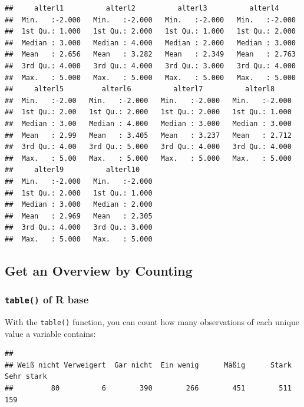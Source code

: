 \documentclass[
  doc]{apa6}
\newenvironment{Shaded}{\begin{snugshade}}{\end{snugshade}}
\newcommand{\FunctionTok}[1]{\textcolor[rgb]{0.13,0.29,0.53}{\textbf{#1}}}
\newcommand{\NormalTok}[1]{#1}
\newcommand{\SpecialCharTok}[1]{\textcolor[rgb]{0.81,0.36,0.00}{\textbf{#1}}}
\begin{document}
\begin{verbatim}
##     alterl1          alterl2          alterl3          alterl4      
##  Min.   :-2.000   Min.   :-2.000   Min.   :-2.000   Min.   :-2.000  
##  1st Qu.: 1.000   1st Qu.: 2.000   1st Qu.: 1.000   1st Qu.: 2.000  
##  Median : 3.000   Median : 4.000   Median : 2.000   Median : 3.000  
##  Mean   : 2.656   Mean   : 3.282   Mean   : 2.349   Mean   : 2.763  
##  3rd Qu.: 4.000   3rd Qu.: 4.000   3rd Qu.: 3.000   3rd Qu.: 4.000  
##  Max.   : 5.000   Max.   : 5.000   Max.   : 5.000   Max.   : 5.000  
##     alterl5         alterl6          alterl7          alterl8      
##  Min.   :-2.00   Min.   :-2.000   Min.   :-2.000   Min.   :-2.000  
##  1st Qu.: 2.00   1st Qu.: 2.000   1st Qu.: 2.000   1st Qu.: 1.000  
##  Median : 3.00   Median : 4.000   Median : 3.000   Median : 3.000  
##  Mean   : 2.99   Mean   : 3.405   Mean   : 3.237   Mean   : 2.712  
##  3rd Qu.: 4.00   3rd Qu.: 5.000   3rd Qu.: 4.000   3rd Qu.: 4.000  
##  Max.   : 5.00   Max.   : 5.000   Max.   : 5.000   Max.   : 5.000  
##     alterl9          alterl10     
##  Min.   :-2.000   Min.   :-2.000  
##  1st Qu.: 2.000   1st Qu.: 1.000  
##  Median : 3.000   Median : 2.000  
##  Mean   : 2.969   Mean   : 2.305  
##  3rd Qu.: 4.000   3rd Qu.: 3.000  
##  Max.   : 5.000   Max.   : 5.000
\end{verbatim}

\hypertarget{get-an-overview-by-counting}{%
\subsection{Get an Overview by Counting}\label{get-an-overview-by-counting}}

\hypertarget{table-of-r-base}{%
\subsubsection{\texorpdfstring{\texttt{table()} of R base}{table() of R base}}\label{table-of-r-base}}

With the \texttt{table()} function, you can count how many observations of each unique value a variable contains:

\begin{Shaded}
\end{Shaded}

\begin{verbatim}
## 
## Weiß nicht Verweigert  Gar nicht  Ein wenig      Mäßig      Stark Sehr stark 
##         80          6        390        266        451        511        159
\end{verbatim}
\end{document}
